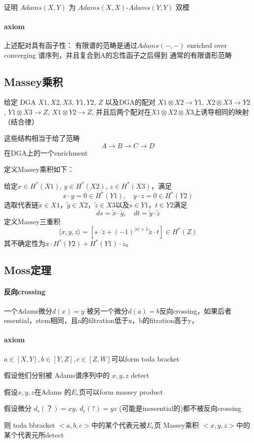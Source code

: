\documentclass[12pt]{article}
\begin{document}
\paragraph{}证明 $Adams(X,Y)$ 为 $Adams(X,X)$-$Adams(Y,Y)$ 双模

\paragraph{axiom}上述配对具有函子性：
有限谱的范畴是通过$Adams(-,-)$ enriched over converging 谱序列，并且复合到A的忘性函子之后得到 通常的有限谱形范畴

\subsection{Massey乘积}
给定 DGA $X1,X2,X3$, $Y1,Y2$, $Z$ 以及DGA的配对
$X1\otimes X2\rightarrow Y1$,
$X2\otimes X3\rightarrow Y2$,
$Y1\otimes X3\rightarrow Z$,
$X1\otimes Y2\rightarrow Z$,
并且后两个配对在$X1\otimes X2\otimes X3$上诱导相同的映射（结合律）

这些结构相当于给了范畴
$$A\rightarrow B\rightarrow C\rightarrow D$$
在DGA上的一个enrichment

定义Massey乘积如下：

给定$x\in H^*(X1)$, $y\in H^*(X2)$, $z\in H^*(X3)$，满足
$$x\cdot y = 0 \in H^*(Y1), \quad y\cdot z = 0 \in H^*(Y2)$$
选取代表链$\tilde{x}\in X1$，$\tilde{y}\in X2$，$\tilde{z}\in X3$以及$s\in Y1$，$t\in Y2$满足
$$ds = \tilde{x}\cdot\tilde{y}, \quad dt = \tilde{y}\cdot\tilde{z}$$
定义Massey三重积
$$\langle x,y,z\rangle = \left[s\cdot\tilde{z} + (-1)^{|x|+1}\tilde{x}\cdot t\right] \in H^*(Z)$$
其不确定性为$x\cdot H^*(Y2) + H^*(Y1)\cdot z$。

\subsection{Moss定理}

\paragraph{反向crossing} 一个Adams微分$d(x)=y$ 被另一个微分$d(a)=b$反向crossing，如果后者essential，stem相同，且a的filtration低于x，b的fitration高于y，

\paragraph{axiom}
$a\in[X,Y],b\in[Y,Z],c\in[Z,W]$可以form  toda bracket

假设他们分别被 Adams谱序列中的 $x,y,z$
detect

假设$x,y,z$在Adams 的$E_r$页可以form massey product 

假设微分 $d_r(？)=xy$, $d_r(?)=yz$ (可能是inessential的)都不被反向crossing

则
toda bbracket $<a,b,c>$中的某个代表元被$E_r$页
Massey乘积
$<x,y,z>$中的某个代表元所detect
\end{document}
